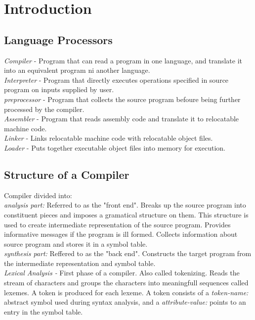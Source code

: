 \section{Introduction}

\subsection{Language Processors}
\emph{Compiler} - Program that can read a program in one language, and translate it into an equivalent program ni another language. \\
\emph{Interpreter} - Program that directly executes operations specified in source program on inputs supplied by user. \\
\emph{preprocessor} - Program that collects the source program befoure being further processed by the compiler. \\
\emph{Assembler} - Program that reads assembly code and translate it to relocatable machine code. \\
\emph{Linker} - Links relocatable machine code with relocatable object files. \\
\emph{Loader} - Puts together executable object files into memory for execution. \\

\subsection{Structure of a Compiler}
Compiler divided into:\\
\emph{analysis part:} Referred to as the "front end". Breaks up the source program into constituent pieces and imposes a gramatical structure on them. This structure is used to create intermediate representation of the source program. Provides informative messages if the program is ill formed. Collects information about source program and stores it in a symbol table. \\
\emph{synthesis part:} Reffered to as the "back end". Constructs the target program from the intermediate representation and symbol table. \\ 

\emph{Lexical Analysis - }
First phase of a compiler. Also called tokenizing. Reads the stream of characters and groups the characters into meaningfull sequences called lexemes. A token is produced for each lexeme. A token consists of a \emph{token-name:} abstract symbol used during syntax analysis, and a \emph{attribute-value:} points to an entry in the symbol table. \\ 

